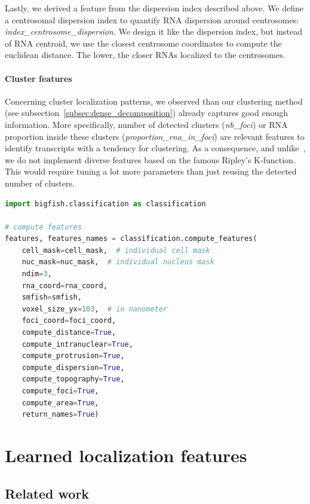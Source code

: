 Lastly, we derived a feature from the dispersion index described above.
We define a centrosomal dispersion index to quantify \ac{RNA} dispersion around centrosomes: \emph{index\_centrosome\_dispersion}.
We design it like the dispersion index, but instead of \ac{RNA} centroid, we use the closest centrosome coordinates to compute the euclidean distance.
The lower, the closer \ac{RNA}s localized to the centrosomes.

\paragraph{Cluster features}

Concerning cluster localization patterns, we observed than our clustering method (see subsection~\ref{subsec:dense_decomposition}) already captures good enough information.
More specifically, number of detected clusters (\emph{nb\_foci}) or \ac{RNA} proportion inside these clusters (\emph{proportion\_rna\_in\_foci}) are relevant features to identify transcripts with a tendency for clustering.
As a consequence, and unlike~\cite{samacoits_computational_2018}, we do not implement diverse features based on the famous Ripley's K-function.
This would require tuning a lot more parameters than just reusing the detected number of clusters.

\begin{minipage}{0.9\textwidth}
\begin{lstlisting}[language=Python]
import bigfish.classification as classification

# compute features
features, features_names = classification.compute_features(
    cell_mask=cell_mask,  # individual cell mask
	nuc_mask=nuc_mask,  # individual nucleus mask
	ndim=3,
	rna_coord=rna_coord,
    smfish=smfish,
	voxel_size_yx=103,  # in nanometer
    foci_coord=foci_coord,
    compute_distance=True,
    compute_intranuclear=True,
    compute_protrusion=True,
    compute_dispersion=True,
    compute_topography=True,
    compute_foci=True,
    compute_area=True,
    return_names=True)
\end{lstlisting}
\end{minipage}

\section{Learned localization features} \label{sec:learned_features}


\subsection{Related work} \label{subsec:related_work_learned_features}

